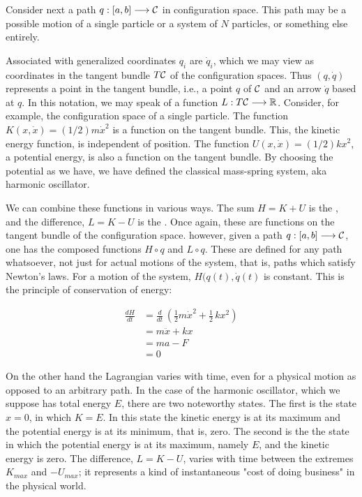 Consider next a path $q: [a,b] \longrightarrow \mathcal{C}$ in configuration space.  This path may be a possible motion of a single particle or a system of $N$ particles, or something else entirely.

Associated with generalized coordinates $q_i$ are  $\dot q_i$, which we may view as coordinates in the tangent bundle $ T\mathcal{C}$ of the configuration spaces.  Thus $(q,\dot q)$ represents  a point in the tangent bundle, i.e., a point $q$ of $\mathcal{C}$ and an arrow $\dot q$ based at $q$. In this notation, we may speak of a function $L: T\mathcal{C} \longrightarrow \mathbb{R}$.  Consider, for example, the configuration space of a single particle.  The function $K(x, \dot x) = (1/2)m\dot x^2$ is a function on the tangent bundle. This, the kinetic energy function, is independent of position.  The function $U(x, \dot x) = (1/2)kx^2$, a potential energy, is also a function on the tangent bundle.  By choosing the potential as we have, we have defined the classical mass-spring system, aka harmonic oscillator.

We can combine these functions in various ways.  The sum $H = K + U$ is the , and the difference, $L = K - U$ is the .  Once again, these are functions on the tangent bundle of the configuration space.  however, given a path $q: [a, b] \longrightarrow \mathcal{C}$, one has the composed functions $H\circ q$ and $L \circ q$.  These are defined for any path whatsoever, not just for actual motions of the system, that is, paths which satisfy Newton's laws. For a motion of the system, $H(q(t), \dot q(t)$ is constant.  This is the principle of conservation of energy:

\begin{align}
\frac{dH}{dt} &= \frac{d}{dt}\,\left( \frac{1}{2}m\dot x^2 + \frac{1}{2}\,kx^2\right) \\
&= m\ddot x + kx \\
& = ma - F \\
& = 0
\end{align}

On the other hand the Lagrangian varies with time, even for a physical motion as opposed to an arbitrary path.  In the case of the harmonic oscillator, which we suppose has total energy $E$, there are two noteworthy states.  The first is the state $x = 0$, in which $K = E$.  In this state the kinetic energy is at its maximum and the potential energy is at its minimum, that is, zero.  The second is the the state in which the potential energy is at its maximum, namely $E$, and the kinetic energy is zero.  The difference, $L = K - U$, varies with time between the extremes $K_{max}$ and $-U_{max}$; it represents a kind of instantaneous "cost of doing business" in the physical world.

